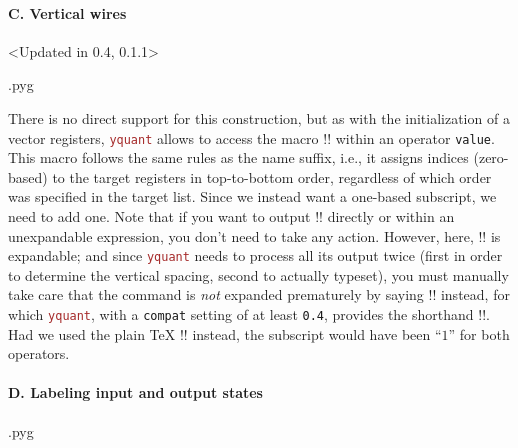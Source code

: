 \documentclass{scrartcl}
\makeatletter
\newenvironment{codeexample}{%
   \VerbatimEnvironment%
   \let\FVB@VerbatimOut\minted@FVB@VerbatimOut
   \let\FVE@VerbatimOut\minted@FVE@VerbatimOut
   \minted@configlang{tex}%
   \minted@fvset
   \begin{VerbatimOut}[codes={\catcode`\^^I=12},firstline,lastline]{\minted@jobname.pyg}%
}{
   \end{VerbatimOut}%
   \minted@langlinenoson%
   \savebox\codeexamplebox{ \minted@jobname.pyg}%
   \ifdim\wd\codeexamplebox>\dimexpr.5\linewidth-3mm\relax%
      \wd\codeexamplebox=.5\linewidth%
   \else%
      \wd\codeexamplebox=\dimexpr\wd\codeexamplebox+3mm\relax%
   \fi%
   \noindent\begin{minipage}{\wd\codeexamplebox}%
      \centering%
      \usebox\codeexamplebox%
   \end{minipage}%
   \begin{minipage}{\dimexpr\linewidth-\wd\codeexamplebox\relax}%
      \expandafter\minted@pygmentize\expandafter{\minted@lang}%
   \end{minipage}%
   \minted@langlinenosoff%
   \par%
}
\def\pkg#1{\textcolor{brown}{\texttt{#1}}}
\def\Yquant{\pkg{yquant}}
\makeatother
\begin{document}
            \paragraph{C. Vertical wires}\leavevmode
               \begin{example}<Updated in 0.4, 0.1.1>
                  \begin{codeexample}
                  \end{codeexample}
                  There is no direct support for this construction, but as with the initialization of a vector registers, \Yquant{} allows to access the macro \tex!\idx! within an operator \texttt{value}.
                  This macro follows the same rules as the name suffix, i.e., it assigns indices (zero\hyp based) to the target registers in top\hyp to\hyp bottom order, regardless of which order was specified in the target list.
                  Since we instead want a one\hyp based subscript, we need to add one.
                  Note that if you want to output \tex!\idx! directly or within an unexpandable expression, you don't need to take any action.
                  However, here, \tex!\the! is expandable; and since \Yquant{} needs to process all its output twice (first in order to determine the vertical spacing, second to actually typeset), you must manually take care that the command is \emph{not} expanded prematurely by saying \tex!\protect\the! instead, for which \Yquant{}, with a \texttt{compat} setting of at least \texttt{0.4}, provides the shorthand \tex!\The!.
                  Had we used the plain \TeX{} \tex!\the! instead, the subscript would have been ``$1$'' for both operators.
               \end{example}

            \paragraph{D. Labeling input and output states}\leavevmode
               \begin{example}
                  \begin{codeexample}
                  \end{codeexample}
               \end{example}
\end{document}
